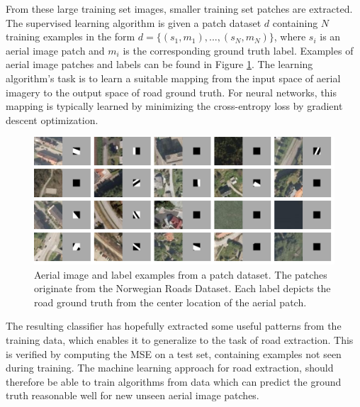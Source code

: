 From these large training set images, smaller training set patches are extracted. The supervised learning algorithm is given a patch dataset $d$ containing $N$ training examples in the form $d=\{(s_1, m_1),...,(s_N, m_N)\}$, where $s_i$ is an aerial image patch and $m_i$ is the corresponding ground truth label. Examples of aerial image patches and labels can be found in Figure \ref{fig:examples_background}. The learning algorithm's task is to learn a suitable mapping from the input space of aerial imagery to the output space of road ground truth. For neural networks, this mapping is typically learned by minimizing the cross-entropy loss by gradient descent optimization.\\

\begin{figure}
\begin{center}
\includegraphics[width=1\columnwidth]{figs/examples.png}
\caption[Patch dataset examples]{Aerial image and label examples from a patch dataset. The patches originate from the Norwegian Roads Dataset. Each label depicts the road ground truth from the center location of the aerial patch.}
\label{fig:examples_background}
\end{center}
\end{figure}

 The resulting classifier has hopefully extracted some useful patterns from the training data, which enables it to generalize to the task of road extraction. This is verified by computing the \ac{MSE} on a test set, containing examples not seen during training. The machine learning approach for road extraction, should therefore be able to train algorithms from data which can predict the ground truth reasonable well for new unseen aerial image patches. \\

